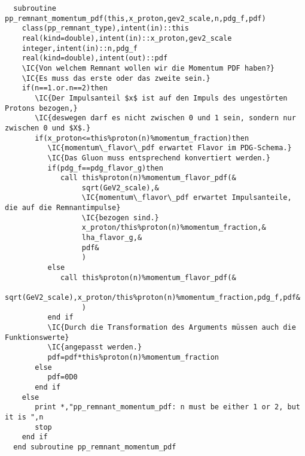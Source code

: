 \begin{Verbatim}
  subroutine pp_remnant_momentum_pdf(this,x_proton,gev2_scale,n,pdg_f,pdf)
    class(pp_remnant_type),intent(in)::this
    real(kind=double),intent(in)::x_proton,gev2_scale
    integer,intent(in)::n,pdg_f
    real(kind=double),intent(out)::pdf
    \IC{Von welchem Remnant wollen wir die Momentum PDF haben?}
    \IC{Es muss das erste oder das zweite sein.}
    if(n==1.or.n==2)then
       \IC{Der Impulsanteil $x$ ist auf den Impuls des ungestörten Protons bezogen,}
       \IC{deswegen darf es nicht zwischen 0 und 1 sein, sondern nur zwischen 0 und $X$.}
       if(x_proton<=this%proton(n)%momentum_fraction)then
          \IC{momentum\_flavor\_pdf erwartet Flavor im PDG-Schema.}
          \IC{Das Gluon muss entsprechend konvertiert werden.}
          if(pdg_f==pdg_flavor_g)then
             call this%proton(n)%momentum_flavor_pdf(&
                  sqrt(GeV2_scale),&
                  \IC{momentum\_flavor\_pdf erwartet Impulsanteile, die auf die Remnantimpulse}
                  \IC{bezogen sind.}
                  x_proton/this%proton(n)%momentum_fraction,&
                  lha_flavor_g,&
                  pdf&
                  )
          else
             call this%proton(n)%momentum_flavor_pdf(&
                  sqrt(GeV2_scale),x_proton/this%proton(n)%momentum_fraction,pdg_f,pdf&
                  )
          end if
          \IC{Durch die Transformation des Arguments müssen auch die Funktionswerte}
          \IC{angepasst werden.}
          pdf=pdf*this%proton(n)%momentum_fraction
       else
          pdf=0D0
       end if
    else
       print *,"pp_remnant_momentum_pdf: n must be either 1 or 2, but it is ",n
       stop
    end if
  end subroutine pp_remnant_momentum_pdf
\end{Verbatim}

